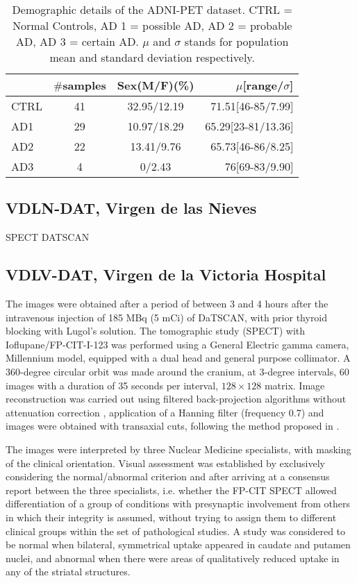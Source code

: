 \begin{table}
	\begin{center}
		\begin{tabular}{lccr}
			\hline
			\hline
			& $\#$samples & Sex(M/F)(\%) & $\mu$[range/$\sigma$] \\
			\hline \hline
			CTRL  & 41 & 32.95/12.19 & 71.51[46-85/7.99]\\
			AD1     & 29 & 10.97/18.29 &65.29[23-81/13.36]\\
			AD2     & 22 & 13.41/9.76  &65.73[46-86/8.25]\\
			AD3     & 4  & 0/2.43      &76[69-83/9.90]\\
			\hline \hline
		\end{tabular}
		\caption[Demographic details of the ADNI-PET dataset.]{Demographic details of the ADNI-PET dataset. CTRL = Normal Controls, AD 1 = possible AD, AD 2 = probable AD, AD 3 = certain AD. $\mu$ and $\sigma$ stands for population mean and standard deviation respectively.}
		\label{tab:bd}
	\end{center}
\end{table}

\subsection{VDLN-DAT, Virgen de las Nieves}\label{sec:vdlndat}
SPECT DATSCAN

\subsection{VDLV-DAT, Virgen de la Victoria Hospital}\label{sec:vdlvdat}
The images were obtained after a period of between 3 and 4 hours after the intravenous injection of 185 MBq (5 mCi) of DaTSCAN, with prior thyroid blocking with Lugol's solution. The tomographic study (SPECT) with Ioflupane/FP-CIT-I-123 was performed using a General Electric gamma camera, Millennium model, equipped with a dual head and general purpose collimator. A 360-degree circular orbit was made around the cranium, at 3-degree intervals, 60 images with a duration of 35 seconds per interval, $128\times128$ matrix. Image reconstruction was carried out using filtered back-projection algorithms without attenuation correction \cite{Shepp82,Vardi1985}, application of a Hanning filter (frequency 0.7) and images were obtained with transaxial cuts, following the method proposed in \cite{Ramirez2009}. 

The images were interpreted by three Nuclear Medicine specialists, with masking of the clinical orientation. Visual assessment was established by exclusively considering the normal/abnormal criterion and after arriving at a consensus report between the three specialists, i.e. whether the FP-CIT SPECT allowed differentiation of a group of conditions with presynaptic involvement from others in which their integrity is assumed, without trying to assign them to different clinical groups within the set of pathological studies. A study was considered to be normal when bilateral, symmetrical uptake appeared in caudate and putamen nuclei, and abnormal when there were areas of qualitatively reduced uptake in any of the striatal structures. 


